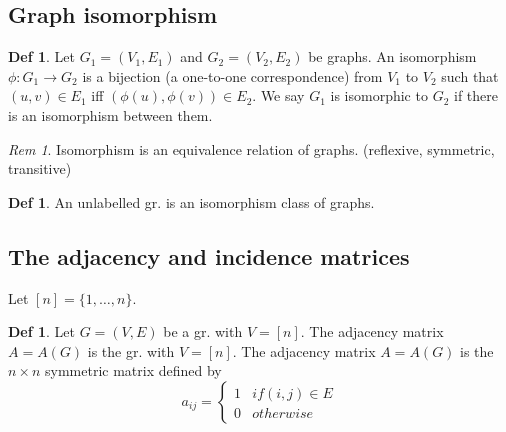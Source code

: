 \documentclass[11pt, fleqn, a4paper, landscape]{article}
\theoremstyle{plain} %
\theoremstyle{remark} %
\newtheorem{rem}[thm]{Rem}
\theoremstyle{definition} %
\newtheorem{defi}[thm]{Def}
\begin{document}
\begin{multicols}{5}
\subsection{Graph isomorphism}
\addtocounter{thm}{1}
\begin{defi}
 Let $G_1 = (V_1,E_1)$ and $G_2 = (V_2,E_2)$ be graphs. An isomorphism $\phi: G_1 \to G_2$ is a bijection (a one-to-one correspondence) from $V_1$ to $V_2$ such that $(u, v) \in E_1$ iff $(\phi(u), \phi(v))\in E_2$. We say $G_1$ is isomorphic to $G_2$ if there is an isomorphism between them.
\end{defi}
\addtocounter{thm}{1}
\begin{rem}
Isomorphism is an equivalence relation of graphs. (reflexive, symmetric, transitive)
\end{rem}


\begin{defi}
An unlabelled gr. is an isomorphism class of graphs.
\end{defi} 

\subsection{The adjacency and incidence matrices}

Let $[n] = \{1, \dots , n\}.$

\begin{defi}
Let $G = (V,E)$ be a gr. with $V = [n].$ The adjacency matrix $A = A(G)$ is the gr. with $ V = [n]$. The adjacency matrix $A = A(G)$ is the
$n \times n $ symmetric matrix defined by
\[a_{ij}=\begin{cases}1 & if (i,j)\in E\\ 0 & otherwise\end{cases}\]
\end{defi} 
\addtocounter{thm}{1}
\addtocounter{thm}{1}


\end{multicols}
\end{document}
